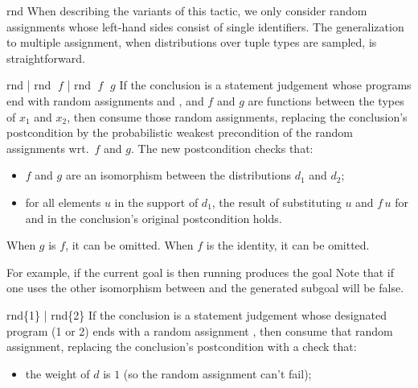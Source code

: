 \begin{tactic}{rnd}
  When describing the variants of this tactic, we only consider random
  assignments whose left-hand sides consist of single identifiers.
  The generalization to multiple assignment, when distributions over
  tuple types are sampled, is straightforward.

  \bigskip
  \begin{tsyntax}{rnd | rnd $\;f$ | rnd $\;f$ $\;g$} If the conclusion
    is a \prhl statement judgement whose programs end with random
    assignments  and , and $f$ and $g$ are functions between the types of
    $x_1$ and $x_2$, then consume those random assignments, replacing
    the conclusion's postcondition by the probabilistic weakest
    precondition of the random assignments wrt.\ $f$ and $g$.  The new
    postcondition checks that:
    \begin{itemize}
    \item $f$ and $g$ are an isomorphism between the distributions
      $d_1$ and $d_2$;

    \item for all elements $u$ in the support of $d_1$, the result
      of substituting $u$ and $f\,u$ for  and
       in the conclusion's original postcondition
      holds.
    \end{itemize}
    When $g$ is $f$, it can be omitted. When $f$ is the identity, it
    can be omitted.

    \bigskip For example, if the current goal is
     then
    running 
    produces the goal
    Note that if one uses the other isomorphism between  and
    \ec{[2..3]} the generated subgoal will be false.
  \end{tsyntax}

  \begin{tsyntax}{rnd\{1\} | rnd\{2\}}
    If the conclusion is a \prhl statement judgement whose designated
    program (1 or 2) ends with a random assignment 
    , then consume that random assignment,
    replacing the conclusion's postcondition with a check that:
    \begin{itemize}
    \item the weight of $d$ is $1$ (so the random assignment can't fail);


\end{itemize}
\end{tsyntax}
\end{tactic}
